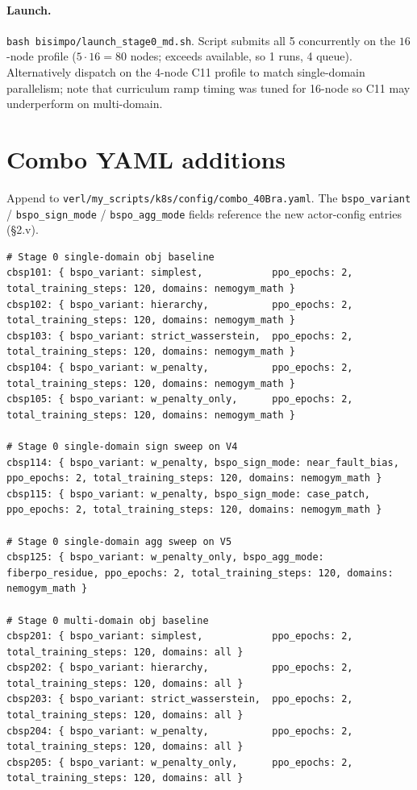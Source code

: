 \documentclass[11pt]{article}
\begin{document}
\paragraph{Launch.}
\verb|bash bisimpo/launch_stage0_md.sh|. Script submits all 5
concurrently on the $16$-node profile ($5\cdot 16 = 80$ nodes; exceeds
available, so 1 runs, 4 queue). Alternatively dispatch on the 4-node
C11 profile to match single-domain parallelism; note that curriculum
ramp timing was tuned for 16-node so C11 may underperform on
multi-domain.

\section{Combo YAML additions}
\label{sec:yaml}

Append to \verb|verl/my_scripts/k8s/config/combo_40Bra.yaml|. The
\verb|bspo_variant| / \verb|bspo_sign_mode| / \verb|bspo_agg_mode|
fields reference the new actor-config entries (\S2.v).

\begin{lstlisting}
# Stage 0 single-domain obj baseline
cbsp101: { bspo_variant: simplest,            ppo_epochs: 2, total_training_steps: 120, domains: nemogym_math }
cbsp102: { bspo_variant: hierarchy,           ppo_epochs: 2, total_training_steps: 120, domains: nemogym_math }
cbsp103: { bspo_variant: strict_wasserstein,  ppo_epochs: 2, total_training_steps: 120, domains: nemogym_math }
cbsp104: { bspo_variant: w_penalty,           ppo_epochs: 2, total_training_steps: 120, domains: nemogym_math }
cbsp105: { bspo_variant: w_penalty_only,      ppo_epochs: 2, total_training_steps: 120, domains: nemogym_math }

# Stage 0 single-domain sign sweep on V4
cbsp114: { bspo_variant: w_penalty, bspo_sign_mode: near_fault_bias, ppo_epochs: 2, total_training_steps: 120, domains: nemogym_math }
cbsp115: { bspo_variant: w_penalty, bspo_sign_mode: case_patch,      ppo_epochs: 2, total_training_steps: 120, domains: nemogym_math }

# Stage 0 single-domain agg sweep on V5
cbsp125: { bspo_variant: w_penalty_only, bspo_agg_mode: fiberpo_residue, ppo_epochs: 2, total_training_steps: 120, domains: nemogym_math }

# Stage 0 multi-domain obj baseline
cbsp201: { bspo_variant: simplest,            ppo_epochs: 2, total_training_steps: 120, domains: all }
cbsp202: { bspo_variant: hierarchy,           ppo_epochs: 2, total_training_steps: 120, domains: all }
cbsp203: { bspo_variant: strict_wasserstein,  ppo_epochs: 2, total_training_steps: 120, domains: all }
cbsp204: { bspo_variant: w_penalty,           ppo_epochs: 2, total_training_steps: 120, domains: all }
cbsp205: { bspo_variant: w_penalty_only,      ppo_epochs: 2, total_training_steps: 120, domains: all }
\end{lstlisting}
\end{document}
